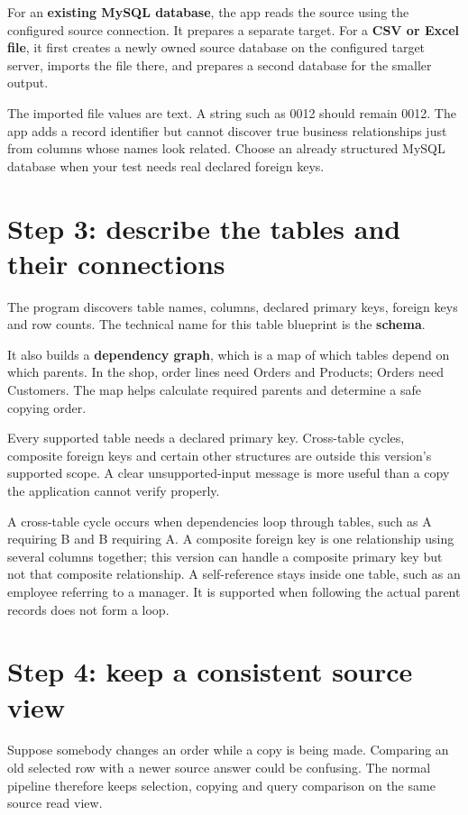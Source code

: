 \documentclass[12pt,a4paper,oneside]{report}
\begin{document}
For an \textbf{existing MySQL database}, the app reads the source using the configured source connection. It prepares a separate target. For a \textbf{CSV or Excel file}, it first creates a newly owned source database on the configured target server, imports the file there, and prepares a second database for the smaller output.

The imported file values are text. A string such as 0012 should remain 0012. The app adds a record identifier but cannot discover true business relationships just from columns whose names look related. Choose an already structured MySQL database when your test needs real declared foreign keys.

\section{Step 3: describe the tables and their connections}
The program discovers table names, columns, declared primary keys, foreign keys and row counts. The technical name for this table blueprint is the \textbf{schema}.

It also builds a \textbf{dependency graph}, which is a map of which tables depend on which parents. In the shop, order lines need Orders and Products; Orders need Customers. The map helps calculate required parents and determine a safe copying order.

Every supported table needs a declared primary key. Cross-table cycles, composite foreign keys and certain other structures are outside this version's supported scope. A clear unsupported-input message is more useful than a copy the application cannot verify properly.

A cross-table cycle occurs when dependencies loop through tables, such as A requiring B and B requiring A. A composite foreign key is one relationship using several columns together; this version can handle a composite primary key but not that composite relationship. A self-reference stays inside one table, such as an employee referring to a manager. It is supported when following the actual parent records does not form a loop.

\section{Step 4: keep a consistent source view}
Suppose somebody changes an order while a copy is being made. Comparing an old selected row with a newer source answer could be confusing. The normal pipeline therefore keeps selection, copying and query comparison on the same source read view.
\end{document}
